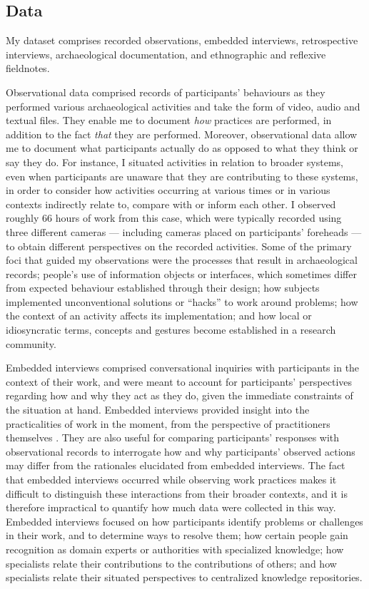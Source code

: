 \documentclass{article}
\begin{document}
\subsection{Data}

My dataset comprises recorded observations, embedded interviews,
retrospective interviews, archaeological documentation, and ethnographic
and reflexive fieldnotes.

Observational data comprised records of participants' behaviours as they
performed various archaeological activities and take the form of video,
audio and textual files. They enable me to document \emph{how} practices
are performed, in addition to the fact \emph{that} they are performed.
Moreover, observational data allow me to document what participants
actually do as opposed to what they think or say they do. For instance,
I situated activities in relation to broader systems, even when
participants are unaware that they are contributing to these systems, in
order to consider how activities occurring at various times or in
various contexts indirectly relate to, compare with or inform each
other. I observed roughly 66 hours of work from this case, which were
typically recorded using three different cameras --- including cameras
placed on participants' foreheads --- to obtain different perspectives
on the recorded activities. Some of the primary foci that guided my
observations were the processes that result in archaeological records;
people's use of information objects or interfaces, which sometimes
differ from expected behaviour established through their design; how
subjects implemented unconventional solutions or ``hacks'' to work
around problems; how the context of an activity affects its
implementation; and how local or idiosyncratic terms, concepts and
gestures become established in a research community.

Embedded interviews comprised conversational inquiries with participants
in the context of their work, and were meant to account for
participants' perspectives regarding how and why they act as they do,
given the immediate constraints of the situation at hand. Embedded
interviews provided insight into the practicalities of work in the
moment, from the perspective of practitioners themselves
\parencites{flick1997}{flick2000}{witzel2000}. They are also useful for
comparing participants' responses with observational records to
interrogate how and why participants' observed actions may differ from
the rationales elucidated from embedded interviews.
The fact that embedded interviews occurred while observing work practices makes it difficult to distinguish these interactions from their broader contexts, and it is therefore impractical to quantify how much data were collected in this way.
Embedded interviews focused on how participants identify problems or challenges in their work, and to determine ways to resolve them; how certain people gain
recognition as domain experts or authorities with specialized knowledge;
how specialists relate their contributions to the contributions of
others; and how specialists relate their situated perspectives to
centralized knowledge repositories.
\end{document}
